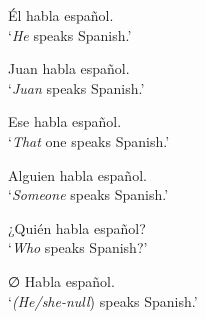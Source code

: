 \documentclass[output=paper]{langscibook}
\begin{document}
\ea Él habla español.\\
\glt `\textit{He} speaks Spanish.’ \label{itm:geeslin:1}

\ex Juan habla español.\\
\glt ‘\textit{Juan} speaks Spanish.’\label{itm:geeslin:2}

\ex Ese habla español.\\
\glt ‘\textit{That} one speaks Spanish.’ \label{itm:geeslin:3}

\ex Alguien habla español.\\
\glt `\textit{Someone} speaks Spanish.’\label{itm:geeslin:4}

\ex ¿Quién habla español?\\
\glt ‘\textit{Who} speaks Spanish?’ \label{itm:geeslin:5}

\ex ∅ Habla español.\\
\glt ‘\textit{(He/she-}{\textit{null}}{)} speaks Spanish.’\label{itm:geeslin:6}

\z
\end{document}
